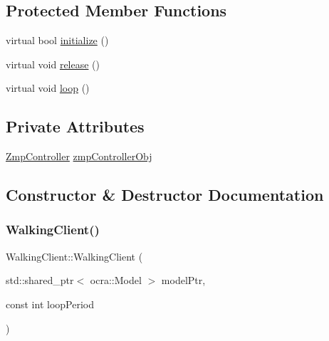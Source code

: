 \subsection*{Protected Member Functions}
\begin{DoxyCompactItemize}
\item 
virtual bool \hyperlink{classWalkingClient_aba6a03fe29a4e947bc6bc0c09a713b2a}{initialize} ()
\item 
virtual void \hyperlink{classWalkingClient_a3b36da9d7649865a13c9318dd73ebc7e}{release} ()
\item 
virtual void \hyperlink{classWalkingClient_afd997bb00534c57fe1b0d5f37f207386}{loop} ()
\end{DoxyCompactItemize}
\subsection*{Private Attributes}
\begin{DoxyCompactItemize}
\item 
\hyperlink{classZmpController}{Zmp\+Controller} \hyperlink{classWalkingClient_a9f236d1c08bf0d517faa29bf907fdc85}{zmp\+Controller\+Obj}
\end{DoxyCompactItemize}


\subsection{Constructor \& Destructor Documentation}
\hypertarget{classWalkingClient_a6c9002a44a54814c4b482739824e39aa}{}\label{classWalkingClient_a6c9002a44a54814c4b482739824e39aa} 
\subsubsection{\texorpdfstring{Walking\+Client()}{WalkingClient()}}
{\footnotesize\ttfamily Walking\+Client\+::\+Walking\+Client (\begin{DoxyParamCaption}\item[{std\+::shared\+\_\+ptr$<$ ocra\+::\+Model $>$}]{model\+Ptr,  }\item[{const int}]{loop\+Period }\end{DoxyParamCaption})}

\hypertarget{classWalkingClient_a1dbc0308f844aea6542750104fddf8e2}{}\label{classWalkingClient_a1dbc0308f844aea6542750104fddf8e2} 
